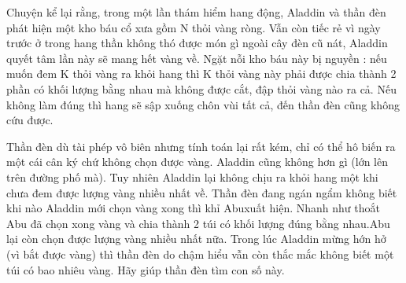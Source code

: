 Chuyện kể lại rằng, trong một lần thám hiểm hang động, Aladdin và thần đèn phát hiện một kho báu cổ xưa gồm N thỏi vàng ròng. Vẫn còn tiếc rẻ vì ngày trước ở trong hang thần không thó được món gì ngoài cây đèn cũ nát, Aladdin quyết tâm lần này sẽ mang hết vàng về. Ngặt nỗi kho báu này bị nguyền : nếu muốn đem K thỏi vàng ra khỏi hang thì K thỏi vàng này phải được chia thành 2 phần có khối lượng bằng nhau mà không được cắt, đập thỏi vàng nào ra cả. Nếu không làm đúng thì hang sẽ sập xuống chôn vùi tất cả, đến thần đèn cũng không cứu được.

Thần đèn dù tài phép vô biên nhưng tính toán lại rất kém, chỉ có thể hô biến ra một cái cân ký chứ không chọn được vàng. Aladdin cũng không hơn gì (lớn lên trên đường phố mà). Tuy nhiên Aladdin lại không chịu ra khỏi hang một khi chưa đem được lượng vàng nhiều nhất về. Thần đèn đang ngán ngẩm không biết khi nào Aladdin mới chọn vàng xong thì khỉ Abuxuất hiện. Nhanh như thoắt Abu đã chọn xong vàng và chia thành 2 túi có khối lượng đúng bằng nhau.Abu lại còn chọn được lượng vàng nhiều nhất nữa. Trong lúc Aladdin mừng hớn hở (vì bắt được vàng) thì thần đèn do chậm hiểu vẫn còn thắc mắc không biết một túi có bao nhiêu vàng. Hãy giúp thần đèn tìm con số này.

\